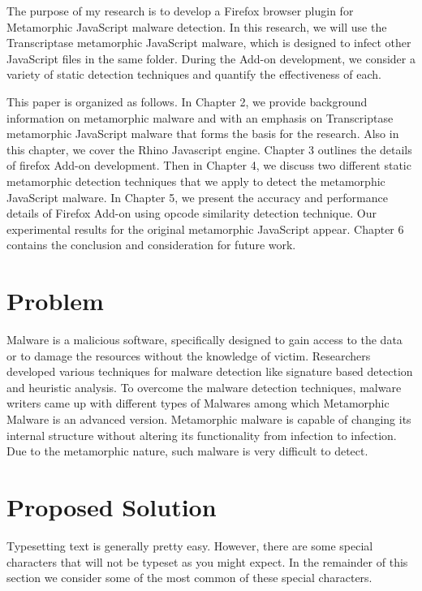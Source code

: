 The purpose of my research is to develop a Firefox browser plugin for Metamorphic JavaScript malware detection. In this research, we will use the Transcriptase metamorphic JavaScript malware, which is designed to infect other JavaScript files in the same folder. During the Add-on development, we consider a variety of static detection techniques and quantify the effectiveness of each. 

This paper is organized as follows. In Chapter 2, we provide background information on metamorphic malware and with an emphasis on Transcriptase metamorphic JavaScript malware that forms the basis for the research. Also in this chapter, we cover the Rhino Javascript engine. Chapter 3 outlines the details of firefox Add-on development. Then in Chapter 4, we discuss two different static metamorphic detection techniques that we apply to detect the metamorphic JavaScript malware. In Chapter 5, we present the accuracy and performance details of Firefox Add-on using opcode similarity detection technique. Our experimental results for the original metamorphic JavaScript appear. Chapter 6 contains the conclusion and consideration for future work.

\section{Problem} 

Malware is a malicious software, specifically designed to gain access to the data or to damage the resources without the knowledge of victim. Researchers developed various techniques for malware detection like signature based detection and heuristic analysis. To overcome the malware detection techniques, malware writers came up with different types of Malwares among which Metamorphic Malware is an advanced version. Metamorphic malware is capable of changing its internal structure without altering its functionality from infection to infection. Due to the metamorphic nature, such malware is very difficult to detect.

\section{Proposed Solution}

Typesetting text is generally pretty easy. However, there are some special
characters that will not be typeset as you might expect. In the remainder of this
section we consider some of the most common of these
special characters. 

